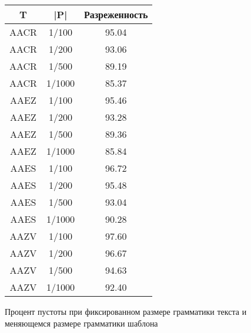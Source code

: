 \documentclass[14pt]{article}
\begin{document}
\begin{figure}	
	\begin{center}
    \begin{tabular}{ | c | c | c |}
        \hline T & |P| & Разреженность \\
		\hline AACR & 1/100 & 95.04 \\
        \hline AACR & 1/200 & 93.06 \\
        \hline AACR & 1/500 & 89.19 \\
        \hline AACR & 1/1000 & 85.37 \\
        \hline AAEZ & 1/100 & 95.46 \\
        \hline AAEZ & 1/200 & 93.28 \\
        \hline AAEZ & 1/500 & 89.36 \\
        \hline AAEZ & 1/1000 & 85.84 \\
        \hline AAES & 1/100 & 96.72 \\
        \hline AAES & 1/200 & 95.48 \\
        \hline AAES & 1/500 & 93.04 \\
        \hline AAES & 1/1000 & 90.28 \\
        \hline AAZV & 1/100 & 97.60 \\
        \hline AAZV & 1/200 & 96.67 \\
        \hline AAZV & 1/500 & 94.63 \\
        \hline AAZV & 1/1000 & 92.40 \\
	\hline
    \end{tabular}
    \end{center}
    \caption{Процент пустоты при фиксированном размере грамматики текста и меняющемся размере грамматики шаблона}
    \label{typical_research}
\end{figure}
\end{document}

